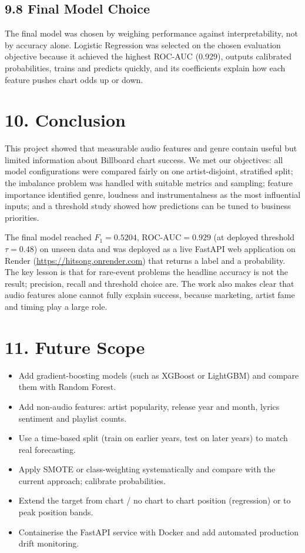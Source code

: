 \documentclass[11pt,a4paper]{article}
\begin{document}
\subsection*{9.8 Final Model Choice}
The final model was chosen by weighing performance against interpretability, not by accuracy alone. Logistic Regression was selected on the chosen evaluation objective because it achieved the highest ROC-AUC (0.929), outputs calibrated probabilities, trains and predicts quickly, and its coefficients explain how each feature pushes chart odds up or down.

\section*{10. Conclusion}
This project showed that measurable audio features and genre contain useful but limited information about Billboard chart success. We met our objectives: all model configurations were compared fairly on one artist-disjoint, stratified split; the imbalance problem was handled with suitable metrics and sampling; feature importance identified genre, loudness and instrumentalness as the most influential inputs; and a threshold study showed how predictions can be tuned to business priorities.

The final model reached $F_1 = 0.5204$, $\text{ROC-AUC} = 0.929$ (at deployed threshold $\tau = 0.48$) on unseen data and was deployed as a live FastAPI web application on Render (\url{https://hitsong.onrender.com}) that returns a label and a probability. The key lesson is that for rare-event problems the headline accuracy is not the result; precision, recall and threshold choice are. The work also makes clear that audio features alone cannot fully explain success, because marketing, artist fame and timing play a large role.

\section*{11. Future Scope}
\begin{itemize}
  \item Add gradient-boosting models (such as XGBoost or LightGBM) and compare them with Random Forest.
  \item Add non-audio features: artist popularity, release year and month, lyrics sentiment and playlist counts.
  \item Use a time-based split (train on earlier years, test on later years) to match real forecasting.
  \item Apply SMOTE or class-weighting systematically and compare with the current approach; calibrate probabilities.
  \item Extend the target from chart / no chart to chart position (regression) or to peak position bands.
  \item Containerise the FastAPI service with Docker and add automated production drift monitoring.
\end{itemize}
\end{document}
